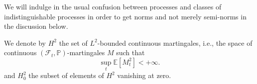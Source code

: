 
 We will indulge in the usual confusion between processes and classes of indistinguishable processes in order to get norms and not merely semi-norms in the discussion below.
 \begin{definition}
 We denote by $H^{2}$ the set of $L^{2}$-bounded continuous martingales, i.e., the space of continuous $\left(\mathcal{F}_{t}, \mathbb{P}\right)$-martingales $M$ such that \[ \sup _{t} \mathbb{E}\left[M_{t}^{2}\right]<+\infty .\] and $H_{0}^{2}$ the subset of elements of $H^{2}$ vanishing at zero.
 \end{definition}

